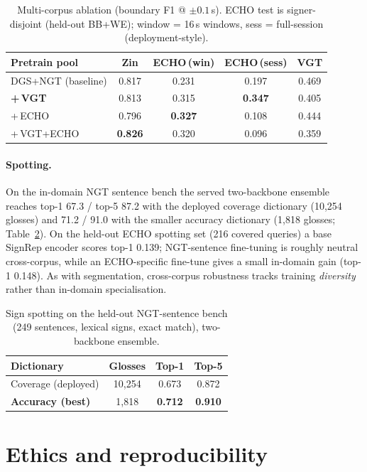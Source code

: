 \documentclass[10pt,twocolumn]{article}
\begin{document}
\begin{table}[t]\centering\small
\caption{Multi-corpus ablation (boundary F1 @ $\pm0.1$\,s). ECHO test is signer-disjoint (held-out BB+WE); window = 16\,s windows, sess = full-session (deployment-style).}
\label{tab:multicorpus}
\begin{tabular}{lcccc}\toprule
Pretrain pool & Zin & ECHO\,(win) & ECHO\,(sess) & VGT\\\midrule
DGS+NGT (baseline) & 0.817 & 0.231 & 0.197 & 0.469\\
\textbf{+\,VGT} & 0.813 & 0.315 & \textbf{0.347} & 0.405\\
+\,ECHO & 0.796 & \textbf{0.327} & 0.108 & 0.444\\
+\,VGT+ECHO & \textbf{0.826} & 0.320 & 0.096 & 0.359\\\bottomrule
\end{tabular}
\end{table}

\paragraph{Spotting.} On the in-domain NGT sentence bench the served two-backbone ensemble
reaches top-1 67.3 / top-5 87.2 with the deployed coverage dictionary (10{,}254 glosses) and
71.2 / 91.0 with the smaller accuracy dictionary (1{,}818 glosses; Table~\ref{tab:spot}). On the
held-out ECHO spotting set (216 covered queries) a base SignRep encoder scores top-1 0.139;
NGT-sentence fine-tuning is roughly neutral cross-corpus, while an ECHO-specific fine-tune gives a
small in-domain gain (top-1 0.148). As with segmentation, cross-corpus robustness tracks training
\emph{diversity} rather than in-domain specialisation.

\begin{table}[t]\centering\small
\caption{Sign spotting on the held-out NGT-sentence bench (249 sentences, lexical signs, exact match), two-backbone ensemble.}
\label{tab:spot}
\begin{tabular}{lccc}\toprule
Dictionary & Glosses & Top-1 & Top-5\\\midrule
Coverage (deployed) & 10{,}254 & 0.673 & 0.872\\
\textbf{Accuracy (best)} & 1{,}818 & \textbf{0.712} & \textbf{0.910}\\\bottomrule
\end{tabular}
\end{table}

\section{Ethics and reproducibility}
\end{document}
